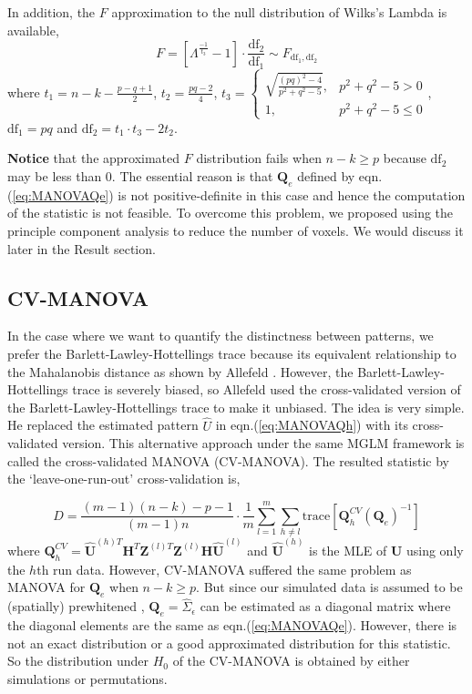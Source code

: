 \documentclass[english]{article}\usepackage[]{graphicx}\usepackage[]{color}
\begin{document}
In addition, the $F$ approximation \cite{rao1951asymptotic} to the
null distribution of Wilks's Lambda is available, 
\[
F=\left[\Lambda^{\frac{-1}{t_{3}}}-1\right]\cdot\frac{\text{df}_{2}}{\text{df}_{1}}\sim F_{\text{df}_{1},\text{df}_{2}}
\]
where $t_{1}=n-k-\frac{p-q+1}{2}$, $t_{2}=\frac{pq-2}{4}$, $t_{3}=\begin{cases}
\sqrt{\frac{\left(pq\right)^{2}-4}{p^{2}+q^{2}-5}}, & p^{2}+q^{2}-5>0\\
1, & p^{2}+q^{2}-5\le0
\end{cases}$, $\text{df}_{1}=pq$ and $\text{df}_{2}=t_{1}\cdot t_{3}-2t_{2}$. 

\textbf{Notice} that the approximated $F$ distribution fails when
$n-k\ge p$ because $\text{df}_{2}$ may be less than $0$. The essential
reason is that $\boldsymbol{Q}_{e}$ defined by eqn.(\ref{eq:MANOVAQe})
is not positive-definite in this case and hence the computation of
the statistic is not feasible. To overcome this problem, we proposed
using the principle component analysis to reduce the number of voxels.
We would discuss it later in the Result section. 


\subsection{CV-MANOVA}

In the case where we want to quantify the distinctness between patterns,
we prefer the Barlett-Lawley-Hottellings trace because its equivalent
relationship to the Mahalanobis distance as shown by Allefeld \cite{allefeld2014searchlight}.
However, the Barlett-Lawley-Hottellings trace is severely biased,
so Allefeld used the cross-validated version of the Barlett-Lawley-Hottellings
trace to make it unbiased. The idea is very simple. He replaced the
estimated pattern $\hat{U}$ in eqn.(\ref{eq:MANOVAQh}) with its
cross-validated version. This alternative approach under the same
MGLM framework is called the cross-validated MANOVA (CV-MANOVA). The
resulted statistic by the \textquoteleft leave-one-run-out\textquoteright{}
cross-validation is,

\begin{equation}
D=\frac{(m-1)\left(n-k\right)-p-1}{(m-1)n}\cdot\frac{1}{m}\sum_{l=1}^{m}\sum_{h\neq l}\text{trace}\left[\boldsymbol{Q}_{h}^{CV}\left(\boldsymbol{Q}_{e}\right)^{-1}\right]\label{eq:CVMANOVA}
\end{equation}
where $\boldsymbol{Q}_{h}^{CV}=\hat{\boldsymbol{U}}^{(h)T}\boldsymbol{H}^{T}\boldsymbol{Z}^{(l)T}\boldsymbol{Z}^{(l)}\boldsymbol{H}\hat{\boldsymbol{U}}^{(l)}$
and $\hat{\boldsymbol{U}}^{(h)}$ is the MLE of $\boldsymbol{\boldsymbol{U}}$
using only the $h$th run data. However, CV-MANOVA suffered the same
problem as MANOVA for $\boldsymbol{Q}_{e}$ when $n-k\ge p$. But
since our simulated data is assumed to be (spatially) prewhitened
, $\boldsymbol{Q}_{e}=\hat{\Sigma}_{\epsilon}$ can be estimated as
a diagonal matrix where the diagonal elements are the same as eqn.(\ref{eq:MANOVAQe}).
However, there is not an exact distribution or a good approximated
distribution for this statistic. So the distribution under $H_{0}$
of the CV-MANOVA is obtained by either simulations or permutations. 
\end{document}
